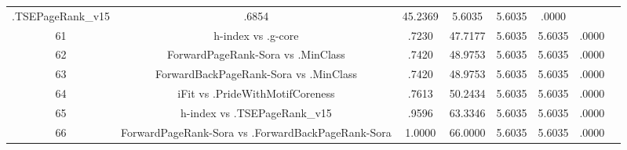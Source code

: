\documentclass[a4paper,10pt]{article}
\begin{document}
\begin{landscape}
\begin{table}[!htp]
\begin{tabular}{cccccccc}
.TSEPageRank_v15&.6854&45.2369&5.6035&5.6035&.0000\\61&h-index vs .g-core&.7230&47.7177&5.6035&5.6035&.0000\\62&ForwardPageRank-Sora vs .MinClass&.7420&48.9753&5.6035&5.6035&.0000\\63&ForwardBackPageRank-Sora vs .MinClass&.7420&48.9753&5.6035&5.6035&.0000\\64&iFit vs .PrideWithMotifCoreness&.7613&50.2434&5.6035&5.6035&.0000\\65&h-index vs .TSEPageRank_v15&.9596&63.3346&5.6035&5.6035&.0000\\66&ForwardPageRank-Sora vs .ForwardBackPageRank-Sora&1.0000&66.0000&5.6035&5.6035&.0000\\\hline
\end{tabular}
\end{table}

\end{landscape}
\end{document}
